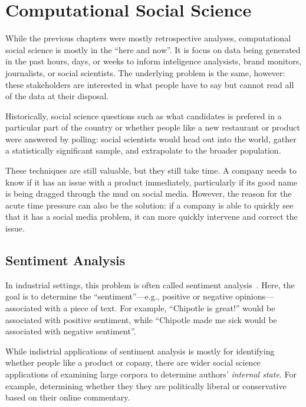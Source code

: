 
\chapter{Computational Social Science}
\label{ch:css}

While the previous chapters were mostly retrospective analyses, computational
social science is mostly in the ``here and now''.  It is focus on data
being generated in the past hours, days, or weeks to inform
inteligence analysists, brand monitors, journalists, or social
scientists.  The underlying problem is the same, however: these
stakeholders are interested in what people have to say but cannot read
all of the data at their disposal.

Historically, social science questions such as what candidates is
prefered in a particular part of the country or whether people like a
new restaurant or product were answered by polling: social scientists
would head out into the world, gather a statistically significant
sample, and extrapolate to the broader population.


These techniques are still valuable, but they still take time.  A
company needs to know if it has an issue with a product immediately,
particularly if its good name is being dragged through the mud on
social media.  However, the reason for the acute time pressure can
also be the solution: if a company is able to quickly see that it has
a social media problem, it can more quickly intervene and correct the
issue.

\section{Sentiment Analysis}

In industrial settings, this problem is often called sentiment
analysis~\citep{pang-08}.  Here, the goal is to determine the
``sentiment''---e.g., positive or negative opinions---associated with
a piece of text.  For example, ``Chipotle is great!'' would be
associated with positive sentiment, while ``Chipotle made me sick
would be associated with negative sentiment''.

While indistrial applications of sentiment analysis is mostly for
identifying whether people like a product or copany, there are wider
social science applications of examining large corpora to determine
authors' \emph{internal state}.  For example, determining whether they
they are politically liberal or conservative based on their online
commentary.

